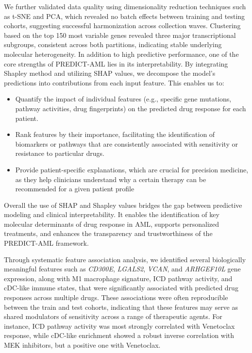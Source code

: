 \documentclass[pdflatex,sn-mathphys-num]{sn-jnl}%
\theoremstyle{thmstyleone}%
\theoremstyle{thmstyletwo}%
\theoremstyle{thmstylethree}%
\begin{document}
We further validated data quality using dimensionality reduction techniques such as t-SNE and PCA, which revealed no batch effects between training and testing cohorts, suggesting successful harmonization across collection waves. 
Clustering based on the top 150 most variable genes revealed three major transcriptional subgroups, consistent across both partitions, indicating stable underlying molecular heterogeneity. 
In addition to high predictive performance, one of the core strengths of PREDICT-AML lies in its interpretability. By integrating Shapley method \cite{shapley1953stochastic} and utilizing SHAP values, we decompose the model’s predictions into contributions from each input feature. 
This enables us to:
\begin{itemize}
    \item Quantify the impact of individual features (e.g., specific gene mutations, pathway activities, drug fingerprints) on the predicted drug response for each patient.
    \item Rank features by their importance, facilitating the identification of biomarkers or pathways that are consistently associated with sensitivity or resistance to particular drugs.
    \item Provide patient-specific explanations, which are crucial for precision medicine, as they help clinicians understand why a certain therapy can be recommended for a given patient profile
\end{itemize}
Overall the use of SHAP and Shapley values bridges the gap between predictive modeling and clinical interpretability. It enables the identification of key molecular determinants of drug response in AML, supports personalized treatments, and enhances the transparency and trustworthiness of the PREDICT-AML framework.

Through systematic feature association analysis, we identified several biologically meaningful features such as \textit{CD300E}, \textit{LGALS2}, \textit{VCAN}, and \textit{ARHGEF10L} gene expression, along with M1 macrophage signature, ICD pathway activity, and cDC-like immune states, that were significantly associated with predicted drug responses across multiple drugs. 
These associations were often reproducible between the train and test cohorts, indicating that these features may serve as shared modulators of sensitivity across a range of therapeutic agents. 
For instance, ICD pathway activity was most strongly correlated with Venetoclax response, while cDC-like enrichment showed a robust inverse correlation with MEK inhibitors, but a positive one with Venetoclax.
\end{document}
